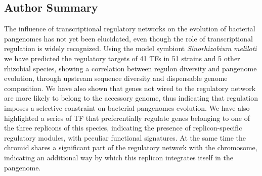 \subsection*{Author Summary}
The influence of transcriptional regulatory networks on the evolution of bacterial pangenomes has not yet been elucidated, even though the role of transcriptional regulation is widely recognized. Using the model symbiont \textit{Sinorhizobium meliloti} we have predicted the regulatory targets of 41 TFs in 51 strains and 5 other rhizobial species, showing a correlation between regulon diversity and pangenome evolution, through upstream sequence diversity and dispensable genome composition. We have also shown that genes not wired to the regulatory network are more likely to belong to the accessory genome, thus indicating that regulation imposes a selective constraint on bacterial pangenomes evolution. We have also highlighted a series of TF that preferentially regulate genes belonging to one of the three replicons of this species, indicating the presence of replicon-specific regulatory modules, with peculiar functional signatures. At the same time the chromid shares a significant part of the regulatory network with the chromosome, indicating an additional way by which this replicon integrates itself in the pangenome.\\

